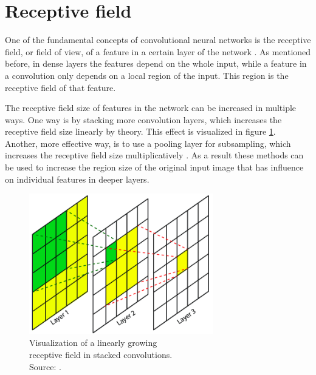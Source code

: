 \section{Receptive field}
\label{receptive_field}
One of the fundamental concepts of convolutional neural networks is the receptive field, or field of view, of a feature in a certain layer of the network \cite[p.~1]{receptive}. As mentioned before, in dense layers the features depend on the whole input, while a feature in a convolution only depends on a local region of the input. This region is the receptive field of that feature. 

\begin{minipage}{0.4\textwidth}
	The receptive field size of features in the network can be increased in multiple ways. One way is by stacking more convolution layers, which increases the receptive field size linearly by theory. This effect is visualized in figure \ref{fig:rec}. Another, more effective way, is to use a pooling layer for subsampling, which increases the receptive field size multiplicatively \cite[p.~1]{receptive}. As a result these methods can be used to increase the region size of the original input image that has influence on individual features in deeper layers. 
\end{minipage}
\begin{minipage}{0.6\textwidth}
	\begin{figure}[H]
		\centering
		\includegraphics[width=8cm]{images/nn/rec.png}
		\caption[Visualization of a linearly growing receptive field in stacked convolutions.]{Visualization of a linearly growing\\\hspace{0\textwidth} receptive field in stacked convolutions.\\\hspace{0\textwidth} Source: \cite{convIm}.}
		\label{fig:rec}
	\end{figure}
\end{minipage}


